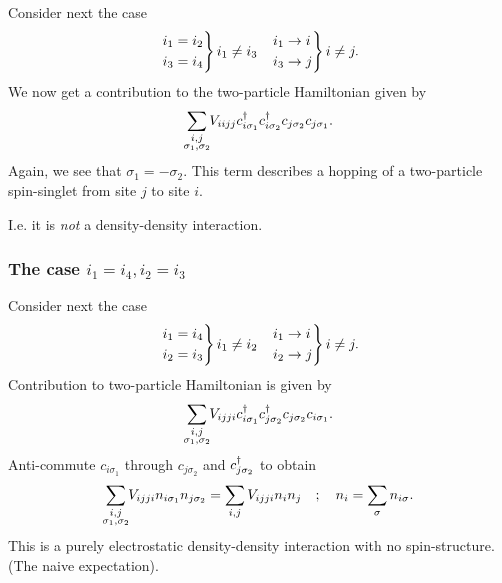 Consider next the case
\begin{align*}
	\begin{rcases}
		i_1 = i_2 \\
		i_3 = i_4
	\end{rcases} i_1 \ne i_3 &&
	\begin{rcases}
		i_1 \rightarrow i \\
		i_3 \rightarrow j
	\end{rcases} i \ne j.
\end{align*}
We now get a contribution to the two-particle Hamiltonian given by 
\begin{equation}
	\sum_{\mathclap{\substack{i,j \\ \sigma_1, \sigma_2}}}V_{iijj}\cd_{i\sigma_1}\cd_{i\sigma_2}c_{j\sigma_2}c_{j\sigma_1}.
\end{equation}
Again, we see that $\sigma_1 = -\sigma_2$. This term describes a hopping of a two-particle spin-singlet from site $j$ to site $i$.
\begin{center}
\end{center}
I.e. it is \emph{not} a density-density interaction.

\subsubsection*{The case $i_1=i_4, i_2=i_3$}
Consider next the case 
\begin{align*}
	\begin{rcases}
		i_1 = i_4 \\
		i_2 = i_3
	\end{rcases} i_1 \ne i_2 &&
	\begin{rcases}
		i_1 \rightarrow i \\
		i_2 \rightarrow j
	\end{rcases} i \ne j.
\end{align*}
Contribution to two-particle Hamiltonian is given by
\begin{equation}
	\sum_{\mathclap{\substack{i,j \\ \sigma_1, \sigma_2}}}V_{ijji}\cd_{i\sigma_1}\cd_{j\sigma_2}c_{j\sigma_2}c_{i\sigma_1}.
\end{equation}
Anti-commute $c_{i\sigma_1}$ through $c_{j\sigma_2}$ and $c^{\dagger}_{j\sigma_2}$ to obtain
\begin{equation}
		\sum_{\mathclap{\substack{i,j \\ \sigma_1, \sigma_2}}}V_{ijji}n_{i\sigma_1}n_{j\sigma_2} = \sum_{i,j}V_{ijji}n_{i}n_{j} \quad ;\quad n_{i} = \sum_{\sigma}n_{i\sigma}.
\end{equation}
This is a purely electrostatic density-density interaction with no spin-structure. (The naive expectation).

